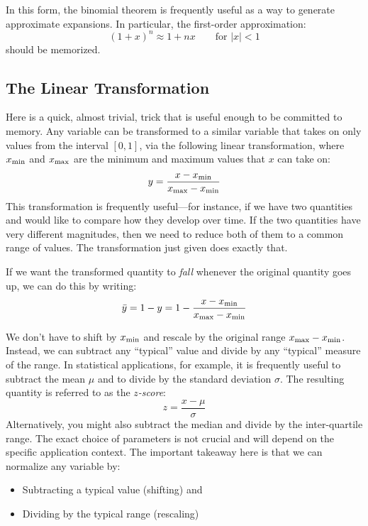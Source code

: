 In this form, the binomial theorem is frequently useful as a way
to generate approximate expansions. In particular, the first-order
approximation:
%
\[
(1+x)^n \approx 1 + nx \qquad \text{for $|x| < 1$}
\]
%
should be memorized.


\subsection{The Linear Transformation}


Here is a quick, almost trivial, trick that is useful enough to be
committed to memory. Any variable can be transformed to a similar
variable that takes on only values from the interval $[0,1]$, via the
following linear transformation, where $x_{\text{\scriptsize min}}$ and
$x_{\text{\scriptsize max}}$ are the minimum and maximum values that $x$
can take on:
%
\[
y = \frac{x - x_{\text{\scriptsize min}}}{x_{\text{\scriptsize max}} - x_{\text{\scriptsize min}}}
\]
%
This transformation is frequently useful---for instance, if we have two
quantities and would like to compare how they develop over time. If
the two quantities have very different magnitudes, then we need to
reduce both of them to a common range of values. The transformation
just given does exactly that.

If we want the transformed quantity to \emph{fall} whenever the
original quantity goes up, we can do this by writing:
%
\[
\bar{y} = 1 - y = 1 - \frac{x - x_{\text{\scriptsize min}}}{x_{\text{\scriptsize max}} - x_{\text{\scriptsize min}}}
\]
%

We don't have to shift by $x_{\text{\scriptsize min}}$ and rescale by the original
range $x_{\text{\scriptsize max}} - x_{\text{\scriptsize min}}$. Instead, we can subtract any
``typical'' value and divide by any ``typical'' measure of the range.
In statistical applications, for example, it is frequently useful to
subtract the mean $\mu$ and to divide by the standard deviation
$\sigma$. The resulting quantity is referred to as the
\emph{$z$-score}:
%
\[
z = \frac{x-\mu}{\sigma}
\]
%
Alternatively, you might also subtract the median and divide by the
inter-quartile range. The exact choice of parameters is not crucial
and will depend on the specific application context. The important
takeaway here is that we can normalize any variable by:
\begin{itemize}
\item Subtracting a typical value (shifting) and
\item Dividing by the typical range (rescaling)
\end{itemize}

